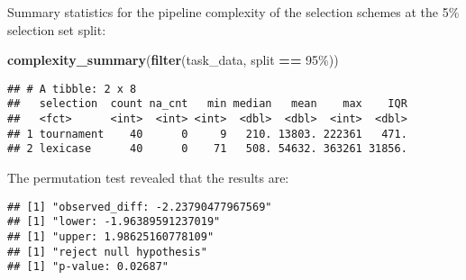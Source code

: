 \documentclass[
]{book}
\newenvironment{Shaded}{\begin{snugshade}}{\end{snugshade}}
\newcommand{\AttributeTok}[1]{\textcolor[rgb]{0.13,0.29,0.53}{#1}}
\newcommand{\DecValTok}[1]{\textcolor[rgb]{0.00,0.00,0.81}{#1}}
\newcommand{\FunctionTok}[1]{\textcolor[rgb]{0.13,0.29,0.53}{\textbf{#1}}}
\newcommand{\NormalTok}[1]{#1}
\newcommand{\OtherTok}[1]{\textcolor[rgb]{0.56,0.35,0.01}{#1}}
\newcommand{\SpecialCharTok}[1]{\textcolor[rgb]{0.81,0.36,0.00}{\textbf{#1}}}
\newcommand{\StringTok}[1]{\textcolor[rgb]{0.31,0.60,0.02}{#1}}
\begin{document}
Summary statistics for the pipeline complexity of the selection schemes at the 5\% selection set split:

\begin{Shaded}
\begin{Highlighting}[]
\FunctionTok{complexity\_summary}\NormalTok{(}\FunctionTok{filter}\NormalTok{(task\_data, split }\SpecialCharTok{==} \StringTok{\textquotesingle{}95\%\textquotesingle{}}\NormalTok{))}
\end{Highlighting}
\end{Shaded}

\begin{verbatim}
## # A tibble: 2 x 8
##   selection  count na_cnt   min median   mean    max    IQR
##   <fct>      <int>  <int> <int>  <dbl>  <dbl>  <int>  <dbl>
## 1 tournament    40      0     9   210. 13803. 222361   471.
## 2 lexicase      40      0    71   508. 54632. 363261 31856.
\end{verbatim}

The permutation test revealed that the results are:

\begin{Shaded}
\end{Shaded}

\begin{verbatim}
## [1] "observed_diff: -2.23790477967569"
## [1] "lower: -1.96389591237019"
## [1] "upper: 1.98625160778109"
## [1] "reject null hypothesis"
## [1] "p-value: 0.02687"
\end{verbatim}
\end{document}
